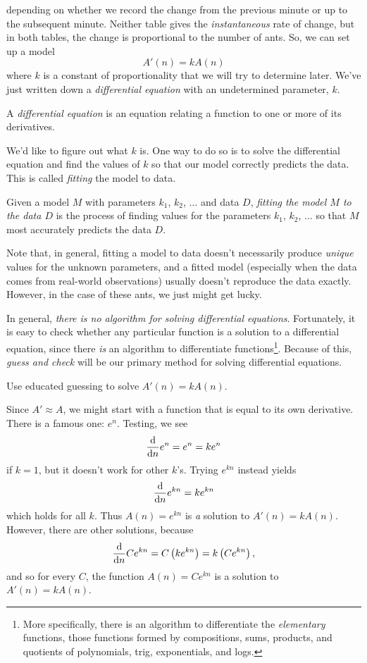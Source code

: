 depending on whether we record the change from the previous minute or up to the subsequent minute. Neither table gives the \emph{instantaneous} rate of
change, but in both tables, the change is proportional to the number of ants. So, we can set up a model
\[
	A'(n) = kA(n)
\]
where $k$ is a constant of proportionality that we will try to determine later. We've just written down a \emph{differential equation} with an undetermined parameter, $k$.

\begin{definition}
	A \emph{differential equation} is an equation relating a function to one or more of its derivatives.
\end{definition}

We'd like to figure out what $k$ is. One way to do so is to solve the differential equation and find the values of $k$ so that our model
correctly predicts the data. This is called \emph{fitting} the model to data.

\begin{definition}
	Given a model $M$ with parameters $k_1$, $k_2$, $\ldots$ and data $D$, \emph{fitting the model $M$ to the data $D$}
	is the process of finding values for the parameters $k_1$, $k_2$, $\ldots$ so that $M$ most accurately predicts the data $D$.
\end{definition}

Note that, in general, fitting a model to data doesn't necessarily produce \emph{unique} values for the unknown parameters, and a fitted model
(especially when the data comes from real-world observations) usually doesn't reproduce the data exactly. However, in the case of these ants, we
just might get lucky.


In general, \emph{there is no algorithm for solving differential equations}. Fortunately, it is easy to check whether any particular
function is a solution to a differential equation, since there \emph{is} an algorithm to differentiate functions\footnote{ More specifically, there is an algorithm
to differentiate the \emph{elementary} functions, those functions formed by compositions, sums, products, and quotients of polynomials, trig, exponentials, and logs.}.
Because of this, \emph{guess and check} will be our primary method for solving differential equations.

\begin{example}
Use educated guessing to solve $A'(n)=kA(n)$.

Since $A'\approx A$, we might start with a function that is equal to its own derivative. There is a famous one: $e^n$. Testing, we see
\[
	\frac{\mathrm{d}}{\mathrm{d} n}e^n=e^n=ke^n
\]
if $k=1$, but it doesn't work for other $k$'s. Trying $e^{kn}$ instead yields
\[
	\frac{\mathrm{d}}{\mathrm{d} n}e^{kn}=ke^{kn}
\]
which holds for all $k$. Thus $A(n)=e^{kn}$ is \emph{a} solution to $A'(n)=kA(n)$. However, there are other solutions, because
\[
	\frac{\mathrm{d}}{\mathrm{d} n}Ce^{kn}=C\left(ke^{kn}\right)=k\left(Ce^{kn}\right),
\]
and so for every $C$, the function $A(n)=Ce^{kn}$ is a solution to $A'(n)=kA(n)$.
\end{example}

